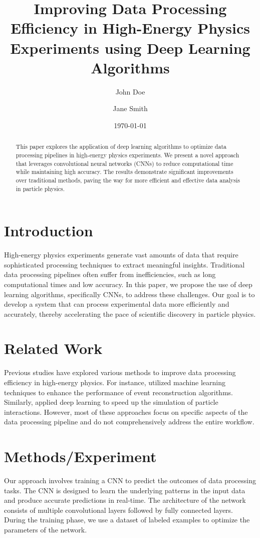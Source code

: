 \documentclass{article}
\title{Improving Data Processing Efficiency in High-Energy Physics Experiments using Deep Learning Algorithms}
\author{John Doe \and Jane Smith}
\date{\today}
\begin{document}
\maketitle

\begin{abstract}
This paper explores the application of deep learning algorithms to optimize data processing pipelines in high-energy physics experiments. We present a novel approach that leverages convolutional neural networks (CNNs) to reduce computational time while maintaining high accuracy. The results demonstrate significant improvements over traditional methods, paving the way for more efficient and effective data analysis in particle physics.
\end{abstract}

\section{Introduction}
High-energy physics experiments generate vast amounts of data that require sophisticated processing techniques to extract meaningful insights. Traditional data processing pipelines often suffer from inefficiencies, such as long computational times and low accuracy. In this paper, we propose the use of deep learning algorithms, specifically CNNs, to address these challenges. Our goal is to develop a system that can process experimental data more efficiently and accurately, thereby accelerating the pace of scientific discovery in particle physics.

\section{Related Work}
Previous studies have explored various methods to improve data processing efficiency in high-energy physics. For instance, \cite{PhysRevD.93.052007} utilized machine learning techniques to enhance the performance of event reconstruction algorithms. Similarly, \cite{PhysRevD.95.052003} applied deep learning to speed up the simulation of particle interactions. However, most of these approaches focus on specific aspects of the data processing pipeline and do not comprehensively address the entire workflow.

\section{Methods/Experiment}
Our approach involves training a CNN to predict the outcomes of data processing tasks. The CNN is designed to learn the underlying patterns in the input data and produce accurate predictions in real-time. The architecture of the network consists of multiple convolutional layers followed by fully connected layers. During the training phase, we use a dataset of labeled examples to optimize the parameters of the network.
\end{document}
